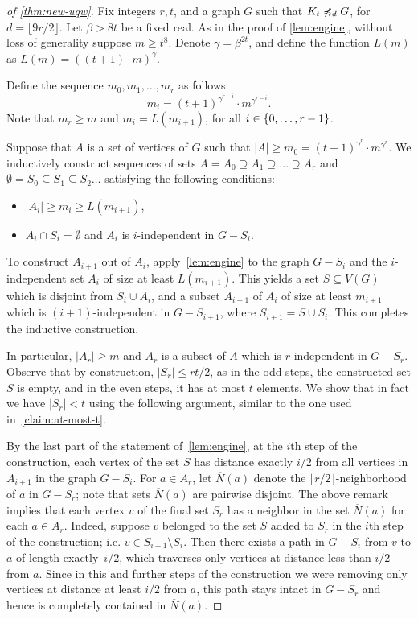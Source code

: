 \begin{proof}[of \cref{thm:new-uqw}]
Fix integers $r,t$,  and a graph $G$ such that $K_t\not\preccurlyeq_{d} G$,
for $d=\lfloor 9r/2 \rfloor$. Let $\beta>8t$ be a fixed real. As in the proof of \cref{lem:engine}, without loss of generality suppose $m\geq t^8$.
 Denote $\gamma=\beta^{2t}$, and
define the function $L(m)$ as $L(m)=((t+1)\cdot m)^\gamma$.

Define the sequence $m_0,m_1,\ldots,m_r$ as follows:
$$m_i=(t+1)^{\gamma^{r-i}}\cdot m^{\gamma^{r-i}}.$$ 
Note that $m_r\geq m$ and $m_i=L(m_{i+1})$, for all $i\in \{0,\ldots,r-1\}$.

Suppose that $A$ is a set of vertices of $G$ such that $|A|\ge m_0=(t+1)^{\gamma^{r}}\cdot m^{\gamma^{r}}$. 
We inductively construct sequences of sets $A= A_0\supseteq A_1\supseteq \ldots \supseteq A_r$ and $\emptyset=S_0\subseteq S_1\subseteq S_2\ldots$
satisfying the following conditions:
\begin{itemize}
	\item $|A_i|\ge m_i \ge L(m_{i+1})$,
	\item $A_i\cap S_i=\emptyset$ and $A_i$ is $i$-independent in $G-S_i$.
\end{itemize}
To construct $A_{i+1}$ out of $A_i$, apply~\cref{lem:engine} to the graph $G-S_i$ and 
the $i$-independent set $A_i$ of size at least $L(m_{i+1})$. This yields a set $S\subseteq V(G)$ which is disjoint from $S_i\cup A_i$, and a subset $A_{i+1}$ of $A_i$ of size 
at least $m_{i+1}$
which is $(i+1)$-independent in $G-S_{i+1}$, where $S_{i+1}=S\cup S_i$. This completes the inductive construction.

In particular,  $|A_r|\ge m$ and $A_r$ is a subset of $A$ which is $r$-independent in $G-S_r$.
Observe that by construction, $|S_r|\le r t/2$, as in the odd steps, the constructed set $S$ is empty, and in the even steps, it has at most $t$ elements. 
We show that in fact we have $|S_r|<t$ using the following argument, similar to the one used in~\cref{claim:at-most-t}.


By the last part of the statement of~\cref{lem:engine},  at the $i$th step of the construction, each vertex of the set $S$
has distance exactly $i/2$ from all vertices in $A_{i+1}$ in the graph 
$G-S_i$. 
For $a\in A_r$, let $\overline{N}(a)$ denote the $\lfloor r/2\rfloor$-neighborhood of $a$ in $G-S_r$; note that sets $\overline{N}(a)$ are pairwise disjoint.
The above remark implies that each vertex $v$ of the final set $S_r$ has a neighbor in the set $\overline{N}(a)$ for each $a\in A_r$.
Indeed, suppose $v$ belonged to the set $S$ added to $S_r$ in the $i$th step of the construction; i.e. $v\in S_{i+1}\setminus S_i$.
Then there exists a path in $G-S_i$ from $v$ to $a$ of length exactly~$i/2$, which traverses only vertices at distance less than $i/2$ from $a$.
Since in this and further steps of the construction we were removing only vertices at distance at least $i/2$ from $a$, this path stays intact in $G-S_r$ and hence is completely contained in $\overline{N}(a)$.


\end{proof}
